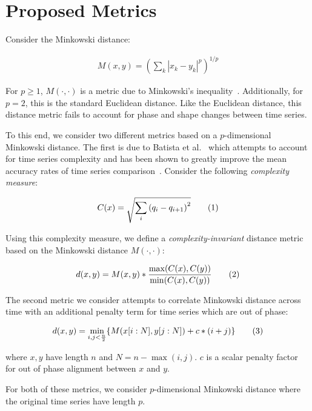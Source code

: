 \documentclass[a4paper]{article}
\newcommand\numberthis{\addtocounter{equation}{1}\tag{\theequation}}
\begin{document}
\section{Proposed Metrics}

Consider the Minkowski distance:

\begin{align*}
    M(x,y) = {(\sum\limits_k |x_k - y_k|^p)}^{1/p}
\end{align*}

For $p \ge 1$, $M(\cdot,\cdot)$ is a metric due to Minkowski's inequality~\cite[p. 190]{wheeden15-measure}.
Additionally, for $p = 2$, this is the standard Euclidean distance.
Like the Euclidean distance, this distance metric fails to account for phase and shape changes between time series.

To this end, we consider two different metrics based on a $p$-dimensional Minkowski distance.
The first is due to Batista et al.~\cite{batista14-cid} which attempts to account for time series complexity and has been shown to greatly improve the mean accuracy rates of time series comparison~\cite{giusti13-ecd}.
Consider the following \textit{complexity measure}:

\begin{align*}
    C(x) = \sqrt{\sum\limits_i {(q_i - q_{i+1})}^2} \numberthis
\end{align*}

Using this complexity measure, we define a \textit{complexity-invariant} distance metric based on the Minkowski distance $M(\cdot,\cdot)$:

\begin{align*}
    d(x,y) = M(x,y) * \frac{\max(C(x),C(y))}{\min(C(x),C(y))} \numberthis
\end{align*}

The second metric we consider attempts to correlate Minkowski distance across time with an additional penalty term for time series which are out of phase:

\begin{align*}
    d(x,y) = \min\limits_{i,j<\frac{n}{2}} \{ M(x[i:N],y[j:N]) + c*(i+j) \} \numberthis \\
\end{align*}

where $x,y$ have length $n$ and $N = n - \max(i,j)$.
$c$ is a scalar penalty factor for out of phase alignment between $x$ and $y$.

For both of these metrics, we consider $p$-dimensional Minkowski distance where the original time series have length $p$.
\end{document}
